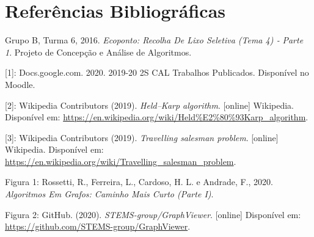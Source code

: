 \documentclass[article, a4paper, 12pt, oneside]{memoir}
\begin{document}
\newpage
\chapter[Referências Bibliográficas][Referências Bibliográficas]{Referências Bibliográficas} \label{\thechapter}
Grupo B, Turma 6, 2016. \textit{Ecoponto: Recolha De Lixo Seletiva (Tema 4) ‐ Parte 1}. Projeto de Concepção e Análise de Algoritmos.

[1]: Docs.google.com. 2020. 2019-20 2S CAL Trabalhos Publicados. Disponível no Moodle.

[2]: Wikipedia Contributors (2019). \textit{Held–Karp algorithm}. [online] Wikipedia. Disponível em: \url{https://en.wikipedia.org/wiki/Held%E2%80%93Karp_algorithm}.

[3]: Wikipedia Contributors (2019). \textit{Travelling salesman problem}. [online] Wikipedia. Disponível em: \url{https://en.wikipedia.org/wiki/Travelling_salesman_problem}.

Figura 1: Rossetti, R., Ferreira, L., Cardoso, H. L. e Andrade, F., 2020. \textit{Algoritmos Em Grafos: Caminho Mais Curto (Parte I)}.

Figura 2: GitHub. (2020). \textit{STEMS-group/GraphViewer}. [online] Disponível em: \url{https://github.com/STEMS-group/GraphViewer}.

‌

‌

\newpage
\end{document}

